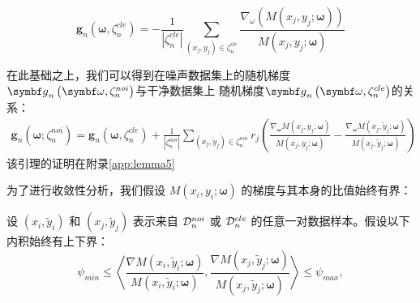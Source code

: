\begin{equation}
\boldsymbol{g}_n\left(\boldsymbol{\omega},\zeta_n^{cle}\right)=-\frac{1}{|\zeta_n^{cle}|}\sum_{\left(x_j,y_j\right)\in \zeta_n^{cle}}\frac{ \nabla_\omega \left(M\left(x_j, y_j; \boldsymbol{\omega}\right)\right)}{M\left(x_j, y_j; \boldsymbol{\omega}\right)}
\end{equation}

在此基础之上，我们可以得到在噪声数据集上的随机梯度$\gb_n\left(\omegab,\zetanoi_n\right)$与干净数据集上
随机梯度$\gb_n\left(\omegab,\zetacle_n\right)$的关系：
\begin{multline}\label{Gradient of noise loss}
\boldsymbol{g}_n\left(\boldsymbol{\omega};\zeta_n^{noi}\right)=\boldsymbol{g}_n\left(\boldsymbol{\omega},\zeta_n^{cle}\right)+\frac{1}{|\zeta_n^{noi}|}\sum_{\left(x_j,\tilde{y}_j\right)\in \zeta_n^{noi}}r_j\left(\frac{\nabla_{\boldsymbol{\omega}} M\left(x_j, y_j; \boldsymbol{\omega}\right)}{M\left(x_j, y_j; \boldsymbol{\omega}\right)} -\frac{\nabla_{\boldsymbol{\omega}} M\left(x_j, \tilde{y}_j; \boldsymbol{\omega}\right)}{M\left(x_j, \tilde{y}_j; \boldsymbol{\omega}\right)}\right)
\end{multline}
该引理的证明在附录\ref{app:lemma5}

为了进行收敛性分析，我们假设 $M(x_i, {y}_i; \boldsymbol{\omega})$ 的梯度与其本身的比值始终有界：
\begin{assumption}\label{ass: bound of m}
设 $\left(x_i,\tilde{y}_i\right)$ 和 $\left(x_j,\tilde{y}_j\right)$ 表示来自 $\mathcal{D}^{noi}_n$ 或 $\mathcal{D}^{cle}_n$ 的任意一对数据样本。假设以下内积始终有上下界：
\begin{equation}
   \psi_{min} \leq \left\langle\frac{\nabla M(x_i, \tilde{y}_i; \boldsymbol{\omega})}{M(x_i, \tilde{y}_i; \boldsymbol{\omega})},\frac{\nabla M(x_j, \tilde{y}_j; \boldsymbol{\omega})}{M(x_j, \tilde{y}_j; \boldsymbol{\omega})}\right\rangle\leq \psi_{max},
\end{equation}
\end{assumption}

